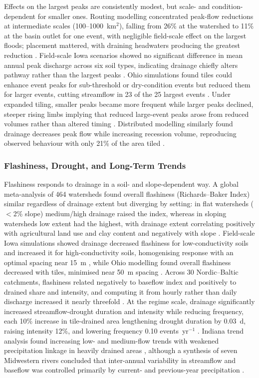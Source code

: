 \documentclass[11pt]{article}
\begin{document}
Effects on the largest peaks are consistently modest, but scale- and condition-dependent for smaller ones. Routing modelling concentrated peak-flow reductions at intermediate scales (100--1000~km$^2$), falling from 26\% at the watershed to 11\% at the basin outlet for one event, with negligible field-scale effect on the largest floods; placement mattered, with draining headwaters producing the greatest reduction \parencite{Sloan2017}. Field-scale Iowa scenarios showed no significant difference in mean annual peak discharge across six soil types, indicating drainage chiefly alters pathway rather than the largest peaks \parencite{Sloan2016}. Ohio simulations found tiles could enhance event peaks for sub-threshold or dry-condition events but reduced them for larger events, cutting streamflow in 23 of the 25 largest events \parencite{Rathore2025}. Under expanded tiling, smaller peaks became more frequent while larger peaks declined, steeper rising limbs implying that reduced large-event peaks arose from reduced volumes rather than altered timing \parencite{Rahman2014}. Distributed modelling similarly found drainage decreases peak flow while increasing recession volume, reproducing observed behaviour with only 21\% of the area tiled \parencite{Fonley2021}.

\subsubsection{Flashiness, Drought, and Long-Term Trends}

Flashiness responds to drainage in a soil- and slope-dependent way. A global meta-analysis of 464 watersheds found overall flashiness (Richards--Baker Index) similar regardless of drainage extent but diverging by setting: in flat watersheds ($<$2\% slope) medium/high drainage raised the index, whereas in sloping watersheds low extent had the highest, with drainage extent correlating positively with agricultural land use and clay content and negatively with slope \parencite{Zhou2025}. Field-scale Iowa simulations showed drainage decreased flashiness for low-conductivity soils and increased it for high-conductivity soils, homogenising response with an optimal spacing near 15~m \parencite{Sloan2016}, while Ohio modelling found overall flashiness decreased with tiles, minimised near 50~m spacing \parencite{Rathore2025}. Across 30 Nordic--Baltic catchments, flashiness related negatively to baseflow index and positively to drained share and intensity, and computing it from hourly rather than daily discharge increased it nearly threefold \parencite{Deelstra2014,Deelstra2014b}. At the regime scale, drainage significantly increased streamflow-drought duration and intensity while reducing frequency, each 10\% increase in tile-drained area lengthening drought duration by 0.03~d, raising intensity 12\%, and lowering frequency 0.10 events~yr$^{-1}$ \parencite{Adelsperger2024}. Indiana trend analysis found increasing low- and medium-flow trends with weakened precipitation linkage in heavily drained areas \parencite{Kumar2009}, although a synthesis of seven Midwestern rivers concluded that inter-annual variability in streamflow and baseflow was controlled primarily by current- and previous-year precipitation \parencite{Baeumler2020}.
\end{document}
